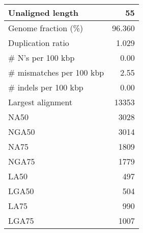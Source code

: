 \documentclass[12pt,a4paper]{article}
\begin{document}
\begin{table}[ht]
\begin{center}
\begin{tabular}{|l*{1}{|r}|}
Unaligned length & 55 \\ \hline
Genome fraction (\%) & 96.360 \\ \hline
Duplication ratio & 1.029 \\ \hline
\# N's per 100 kbp & 0.00 \\ \hline
\# mismatches per 100 kbp & 2.55 \\ \hline
\# indels per 100 kbp & 0.00 \\ \hline
Largest alignment & 13353 \\ \hline
NA50 & 3028 \\ \hline
NGA50 & 3014 \\ \hline
NA75 & 1809 \\ \hline
NGA75 & 1779 \\ \hline
LA50 & 497 \\ \hline
LGA50 & 504 \\ \hline
LA75 & 990 \\ \hline
LGA75 & 1007 \\ \hline
\end{tabular}
\end{center}
\end{table}
\end{document}
